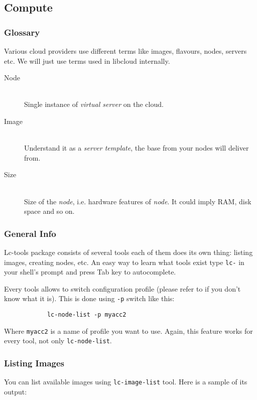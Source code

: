 \documentclass[a4paper]{report}
\begin{document}
         \subsection{Compute}
		 \subsubsection{Glossary}
		    Various cloud providers use different terms like images, flavours, nodes,
		    servers etc. We will just use terms used in libcloud internally.

		    \begin{description}
		       \item[Node] \hfill \\
		       Single instance of \textit{virtual server} on the cloud.
		       \item[Image] \hfill \\
		       Understand it as a \textit{server template}, the base from your nodes
		       will deliver from.
		       \item[Size] \hfill \\
		       Size of the \textit{node}, i.e. hardware features of \textit{node}.
		       It could imply RAM, disk space and so on.
		    \end{description}
		 \subsubsection{General Info}
		 Lc-tools package consists of several tools each of them does its own thing:
		 listing images, creating nodes, etc. An easy way to learn what tools exist
		 type \texttt{lc-} in your shell's prompt and press Tab key to autocomplete.

		 Every tools allows to switch configuration profile (please refer
		 to  if you don't know what it is). This is done using
		 \texttt{-p} switch like this:

		    \begin{verbatim}
		    lc-node-list -p myacc2
		    \end{verbatim}

		 Where \texttt{myacc2} is a name of profile you want to use. Again, this
		 feature works for every tool, not only \texttt{lc-node-list}.

		 \subsubsection{Listing Images}
		    You can list available images using \texttt{lc-image-list} tool. Here
		    is a sample of its output:
\end{document}

